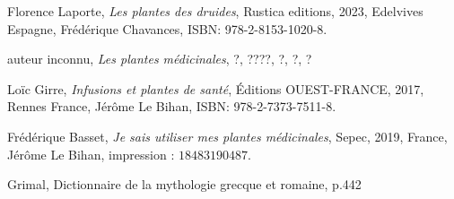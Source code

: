 
\renewcommand{\refname}{}
\begin{thebibliography}{9}

    Florence Laporte,
    \textit{Les plantes des druides},
    Rustica editions, 2023,
    Edelvives Espagne,
    Frédérique Chavances,
    ISBN: 978-2-8153-1020-8.

    auteur inconnu,
    \textit{Les plantes médicinales},
    ?, ????,
    ?,
    ?,
    ?
    
    Loïc Girre,
    \textit{Infusions et plantes de santé},
    \'Editions OUEST-FRANCE, 2017,
    Rennes France,
    Jérôme Le Bihan,
    ISBN: 978-2-7373-7511-8.

    Frédérique Basset,
    \textit{Je sais utiliser mes plantes médicinales},
    Sepec, 2019,
    France,
    Jérôme Le Bihan,
    \no impression : $18483190487$.

    Grimal, 
    Dictionnaire de la mythologie grecque et romaine, 
    p.442
\end{thebibliography}